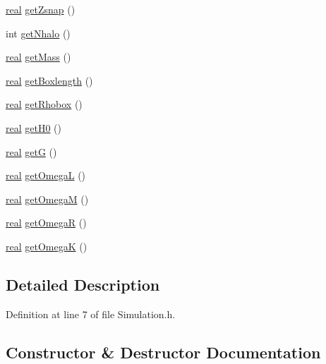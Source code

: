 \begin{DoxyCompactItemize}
\item 
\hyperlink{Global_8h_a031f8951175b43076c2084a6c2173410}{real} \hyperlink{classSimulation_a70be67688cdb92cdadcd21290bd0bb39}{getZsnap} ()
\item 
int \hyperlink{classSimulation_a011d6d7f9e6cdee706653fc958928a5f}{getNhalo} ()
\item 
\hyperlink{Global_8h_a031f8951175b43076c2084a6c2173410}{real} \hyperlink{classSimulation_a6e3b4dd7c028d3061ae2e737623d0f61}{getMass} ()
\item 
\hyperlink{Global_8h_a031f8951175b43076c2084a6c2173410}{real} \hyperlink{classSimulation_ad80fb4b230a52ef977e473ec4d5d1d62}{getBoxlength} ()
\item 
\hyperlink{Global_8h_a031f8951175b43076c2084a6c2173410}{real} \hyperlink{classSimulation_a56c357d09b09072874e2d48dd45ee178}{getRhobox} ()
\item 
\hyperlink{Global_8h_a031f8951175b43076c2084a6c2173410}{real} \hyperlink{classSimulation_a029aa006f05bf05c96a2152b84e22d3f}{getH0} ()
\item 
\hyperlink{Global_8h_a031f8951175b43076c2084a6c2173410}{real} \hyperlink{classSimulation_ac6fd162636a6d20663c468c7333b8e1a}{getG} ()
\item 
\hyperlink{Global_8h_a031f8951175b43076c2084a6c2173410}{real} \hyperlink{classSimulation_ae4579378ff6638e8edee1900a1105335}{getOmegaL} ()
\item 
\hyperlink{Global_8h_a031f8951175b43076c2084a6c2173410}{real} \hyperlink{classSimulation_a88b23998f2fa5a47ef5f11059b4151c8}{getOmegaM} ()
\item 
\hyperlink{Global_8h_a031f8951175b43076c2084a6c2173410}{real} \hyperlink{classSimulation_adf3374ad7de242ada8afaae0218c8058}{getOmegaR} ()
\item 
\hyperlink{Global_8h_a031f8951175b43076c2084a6c2173410}{real} \hyperlink{classSimulation_a5e2c533b06ab140279e74c3a2e9065a9}{getOmegaK} ()
\end{DoxyCompactItemize}


\subsection{Detailed Description}


Definition at line 7 of file Simulation.h.



\subsection{Constructor \& Destructor Documentation}
